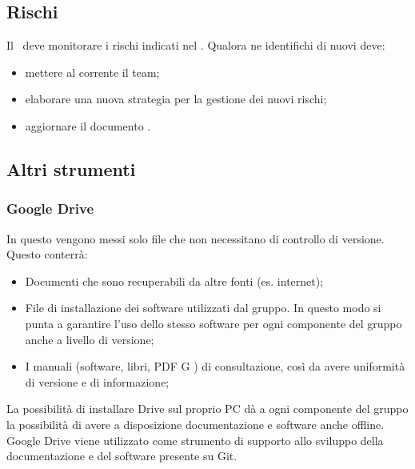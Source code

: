 \documentclass[../NormeDiProgetto.tex]{subfiles}
\begin{document}
		\subsection{Rischi}
			Il \responsabilediprogetto\ deve monitorare i rischi indicati nel \pianodiprogetto. Qualora ne identifichi di nuovi deve:
			\begin{itemize}
				\item mettere al corrente il team;
				\item elaborare una nuova strategia per la gestione dei nuovi rischi;
				\item aggiornare il documento \pianodiprogetto.
			\end{itemize}
		\subsection{Altri strumenti}
			\subsubsection{Google Drive}
				In questo  vengono messi solo file che non necessitano di controllo di versione.
				Questo  conterrà:
				\begin{itemize}
					\item Documenti che sono recuperabili da altre fonti (es. internet);
					\item File di installazione dei software utilizzati dal gruppo. In questo modo si punta a garantire l’uso dello stesso software per ogni componente del gruppo anche a livello di versione;
					\item I manuali (software, libri, PDF G ) di consultazione, così da avere uniformità di versione e di informazione;
				\end{itemize}
				La possibilità di installare Drive sul proprio PC dà a ogni componente del gruppo la possibilità di avere a disposizione documentazione e software anche offline. Google Drive viene utilizzato come strumento di supporto allo sviluppo della documentazione e del software presente su Git.
\end{document}

